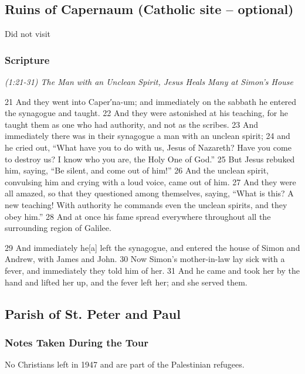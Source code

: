 \documentclass[letterpaper]{report}
\begin{document}
\clearpage
\subsection{Ruins of Capernaum (Catholic site – optional)}
\begin{multicols}{2}
	Did not visit
\end{multicols}
\subsubsection{Scripture}

{\centering
	\emph{(1:21-31) The Man with an Unclean Spirit,
		Jesus Heals Many at Simon’s House}\\
}
\begin{multicols}{2}
21 And they went into Caper′na-um; and immediately on the sabbath he entered the synagogue and taught. 22 And they were astonished at his teaching, for he taught them as one who had authority, and not as the scribes. 23 And immediately there was in their synagogue a man with an unclean spirit; 24 and he cried out, “What have you to do with us, Jesus of Nazareth? Have you come to destroy us? I know who you are, the Holy One of God.” 25 But Jesus rebuked him, saying, “Be silent, and come out of him!” 26 And the unclean spirit, convulsing him and crying with a loud voice, came out of him. 27 And they were all amazed, so that they questioned among themselves, saying, “What is this? A new teaching! With authority he commands even the unclean spirits, and they obey him.” 28 And at once his fame spread everywhere throughout all the surrounding region of Galilee.

29 And immediately he[a] left the synagogue, and entered the house of Simon and Andrew, with James and John. 30 Now Simon’s mother-in-law lay sick with a fever, and immediately they told him of her. 31 And he came and took her by the hand and lifted her up, and the fever left her; and she served them.
\end{multicols}

\clearpage
\subsection{Parish of St. Peter and Paul}
\begin{multicols}{2}
	\mbox{}
\end{multicols}
\subsubsection{Notes Taken During the Tour}
No Christians left in 1947 and are part of the Palestinian refugees.
\end{document}
